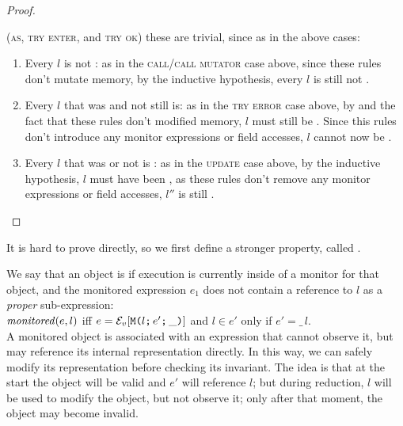 \begin{proof}
\begin{ienumerate}
	\item (\textsc{as}, \textsc{try enter}, and \textsc{try ok}) these are trivial, since as in the above cases:
	\begin{enumerate}
		\item Every \reach $l$ is not \RCR:
			as in the \textsc{call/call mutator} case above, since these rules don't mutate memory, by the inductive hypothesis, every \reach $l$ is still not \RCR.

		\item Every \reach $l$ that was \RCN and not \RM still is:
			as in the \textsc{try error} case above, by  and the fact that these rules don't modified memory, $l$ must still be \RCN. Since this rules don't introduce any monitor expressions or field accesses, $l$ cannot now be \RM.

		\item Every \reach $l$ that was \RM or not \RCN is \HNO:
			as in the \textsc{update} case above, by the inductive hypothesis, $l$ must have been \HNO, as these rules don't remove any monitor expressions or field accesses, $l''$ is still \HNO.
	\end{enumerate}
\end{ienumerate}
\end{proof}

It is hard to prove  directly,
so we first define a stronger property,
called .

\LS

We say that an object is \mony if execution
is currently inside of a monitor for that object, and
the monitored expression $e_1$ does not
contain a reference to $l$ as a \emph{proper} sub-expression:\\
\indent $\mathit{monitored}(e,l)$ iff
$e=\mathcal{E}_v{}[\texttt{M}\texttt{(}{}l\texttt{;}\,e'\texttt{;}\,\_\texttt{)}]$ and $l \in e'$ only if $e' = \_\,l$.\\
\noindent A monitored object is associated with an expression that cannot observe it, but may
reference its internal representation directly.
In this way, we can safely modify its representation before checking its invariant.
The idea is that at the start the object will be valid and $e'$ will reference $l$;
but during reduction, $l$ will be used to
modify the object, but not observe it; only after that moment, the object may become invalid.

\LS

